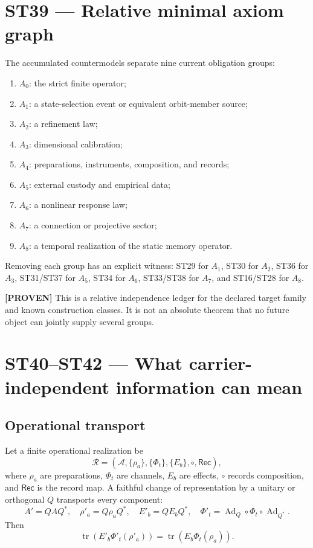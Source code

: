 \documentclass[11pt,a4paper]{article}
\newcommand{\proven}{\textcolor{green!40!black}{\textbf{[PROVEN]}}}
\begin{document}
\section{ST39 --- Relative minimal axiom graph}

The accumulated countermodels separate nine current obligation groups:
\begin{enumerate}
\item $A_0$: the strict finite operator;
\item $A_1$: a state-selection event or equivalent orbit-member source;
\item $A_2$: a refinement law;
\item $A_3$: dimensional calibration;
\item $A_4$: preparations, instruments, composition, and records;
\item $A_5$: external custody and empirical data;
\item $A_6$: a nonlinear response law;
\item $A_7$: a connection or projective sector;
\item $A_8$: a temporal realization of the static memory operator.
\end{enumerate}
Removing each group has an explicit witness: ST29 for $A_1$, ST30 for $A_2$, ST36 for $A_3$, ST31/ST37 for $A_5$, ST34 for $A_6$, ST33/ST38 for $A_7$, and ST16/ST28 for $A_8$.

\proven{} This is a relative independence ledger for the declared target family and known construction classes. It is not an absolute theorem that no future object can jointly supply several groups.

\section{ST40--ST42 --- What carrier-independent information can mean}

\subsection{Operational transport}

Let a finite operational realization be
\[
\mathcal R=(\mathcal A,\{\rho_a\},\{\Phi_t\},\{E_b\},\circ,\mathsf{Rec}),
\]
where $\rho_a$ are preparations, $\Phi_t$ are channels, $E_b$ are effects, $\circ$ records composition, and $\mathsf{Rec}$ is the record map. A faithful change of representation by a unitary or orthogonal $Q$ transports every component:
\[
A'=QAQ^*,\quad \rho'_a=Q\rho_aQ^*,\quad E'_b=QE_bQ^*,\quad
\Phi'_t=\operatorname{Ad}_Q\circ\Phi_t\circ\operatorname{Ad}_{Q^*}.
\]
Then
\[
\operatorname{tr}\!\left(E'_b\Phi'_t(\rho'_a)\right)
=\operatorname{tr}\!\left(E_b\Phi_t(\rho_a)\right).
\]
\end{document}
